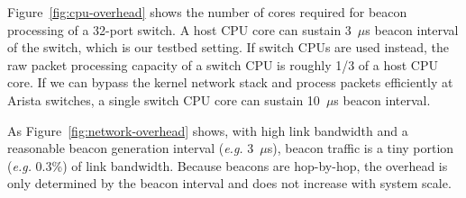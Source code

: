 Figure~\ref{fig:cpu-overhead} shows the number of cores required for beacon processing of a 32-port switch.
A host CPU core can sustain 3~$\mu$s beacon interval of the switch, which is our testbed setting.
If switch CPUs are used instead, the raw packet processing capacity of a switch CPU is roughly 1/3 of a host CPU core.
If we can bypass the kernel network stack and process packets efficiently at Arista switches, a single switch CPU core can sustain 10~$\mu$s beacon interval.


As Figure~\ref{fig:network-overhead} shows, with high link bandwidth and a reasonable beacon generation interval (\emph{e.g.} 3~$\mu$s), beacon traffic is a tiny portion (\emph{e.g.} 0.3\%) of link bandwidth. Because beacons are hop-by-hop, the overhead is only determined by the beacon interval and does not increase with system scale.

